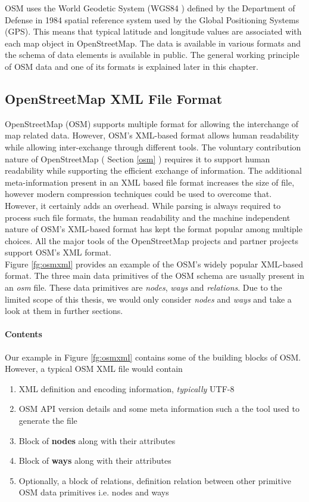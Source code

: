 OSM uses the World Geodetic System (WGS84 \cite{wgs84}) defined by the Department of Defense in 1984 spatial reference system used by the Global Positioning Systems (GPS). This means that typical latitude and longitude values are associated with each map object in OpenStreetMap. The data is available in various formats and the schema of data elements is available in public. The general working principle of OSM data and one of its formats is explained later in this chapter.
\subsection{OpenStreetMap XML File Format}\label{osmxmlff}
OpenStreetMap (OSM) supports multiple format for allowing the interchange of map related data. However, OSM's XML-based \cite{osmxml} format allows human readability while allowing inter-exchange through different tools. The voluntary contribution nature of OpenStreetMap ( Section \ref{osm} ) requires it to support human readability while supporting the efficient exchange of information. The additional meta-information present in an XML based file format increases the size of file, however modern compression techniques could be used to overcome that. However, it certainly adds an overhead. While parsing is always required to process such file formats, the human readability and the machine independent nature of OSM's XML-based format has kept the format popular among multiple choices. All the major tools of the OpenStreetMap projects and partner projects support OSM's XML format. \\

Figure \ref{fg:osmxml} provides an example of the OSM's widely popular XML-based format. The three main data primitives of the OSM schema are usually present in an \textit{osm} file. These data primitives are \textit{nodes}, \textit{ways} and \textit{relations}. Due to the limited scope of this thesis, we would only consider \textit{nodes} and \textit{ways} and take a look at them in further sections.

\paragraph{Contents}
Our example in Figure \ref{fg:osmxml} contains some of the building blocks of OSM. However, a typical OSM XML file would contain
\begin{enumerate}
\item{XML definition and encoding information, \textit{typically} UTF-8}
\item{OSM API version details and some meta information such a the tool used to generate the file}
\item{Block of \textbf{nodes} along with their attributes}
\item{Block of \textbf{ways} along with their attributes}
\item{Optionally, a block of relations, definition relation between other primitive OSM data primitives i.e. nodes and ways}
\end{enumerate}

